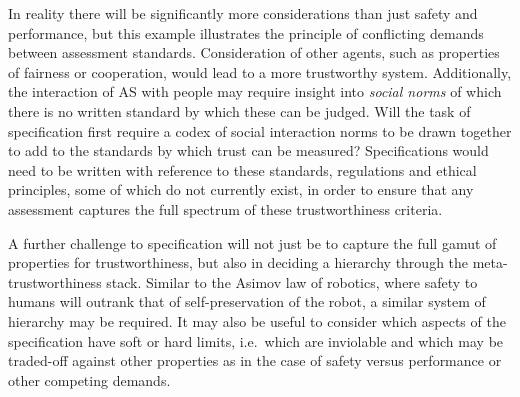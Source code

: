 \documentclass[sigconf,nonacm]{acmart}%
\begin{document}
	
	In reality there will be significantly more considerations than just safety and performance, but this example illustrates the principle of conflicting demands between assessment standards. 
	Consideration of other agents, such as properties of fairness or cooperation, would lead to a more trustworthy system. 
	Additionally, the interaction of AS with people may require insight into \emph{social norms} of which there is no written standard by which these can be judged. Will the task of specification first require a codex of social interaction norms to be drawn together to add to the standards by which trust can be measured? 
	Specifications would need to be written with reference to these standards, regulations and ethical principles, some of which do not currently exist, in order to ensure that any assessment captures the full spectrum of these trustworthiness criteria. 
	
	A further challenge to specification will not just be to capture the full gamut of properties for trustworthiness, but also in deciding a hierarchy through the meta-trustworthiness stack. 
	Similar to the Asimov law of robotics, where safety to humans will outrank that of self-preservation of the robot, a similar system of hierarchy may be required.
	It may also be useful to consider which aspects of the specification have soft or hard limits, i.e.\ which are inviolable and which may be traded-off against other properties as in the case of safety versus performance or other competing demands. 
	
\end{document}
